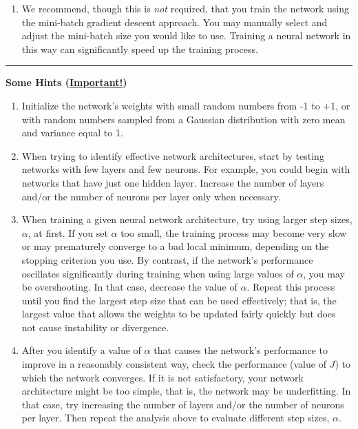 \documentclass{article}
\begin{document}
\begin{enumerate}
    \item We recommend, though this is \textit{not} required, that you train the network using the mini-batch gradient descent approach. You may manually select and adjust the mini-batch size you would like to use. Training a neural network in this way can significantly speed up the training process.
    
\end{enumerate}

\noindent\rule{\textwidth}{0.5pt}

\begin{mybox}[boxpink]
\begin{center}
\noindent \textbf{Some Hints (\underline{Important!})}
\end{center}

{\small
\begin{enumerate}
    \item Initialize the network's weights with small random numbers from -1 to +1, or with random numbers sampled from a Gaussian distribution with zero mean and variance equal to 1.
    \item When trying to identify effective network architectures, start by testing networks with few layers and few neurons. For example, you could begin with networks that have just one hidden layer. Increase the number of layers and/or the number of neurons per layer only when necessary.
    \item When training a given neural network architecture, try using larger step sizes, $\alpha$, at first. If you set $\alpha$ too small, the training process may become very slow or may prematurely converge to a bad local minimum, depending on the stopping criterion you use. By contrast, if the network's performance oscillates significantly during training when using large values of $\alpha$, you may be overshooting. In that case, decrease the value of $\alpha$. Repeat this process until you find the largest step size that can be used effectively; that is, the largest value that allows the weights to be updated fairly quickly but does not cause instability or divergence.
    \item After you identify a value of $\alpha$ that causes the network's performance to improve in a reasonably consistent way, check the performance (value of $J$) to which the network converges. If it is not satisfactory, your network architecture might be too simple, that is, the network may be underfitting. In that case, try increasing the number of layers and/or the number of neurons per layer. Then repeat the analysis above to evaluate different step sizes, $\alpha$.

\end{enumerate}
}

\end{mybox}
\end{document}

